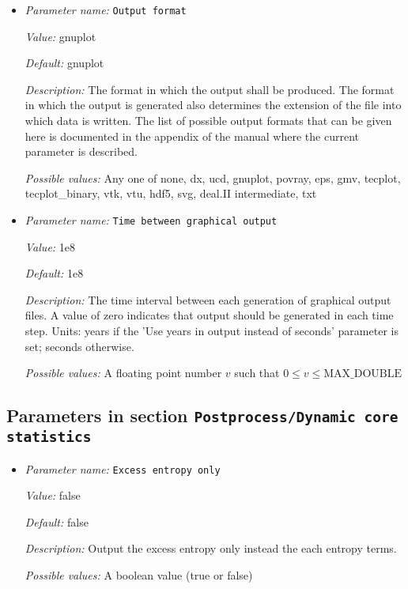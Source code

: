 \begin{itemize}
{\it Possible values:} An integer $n$ such that $1\leq n \leq 2147483647$
\item {\it Parameter name:} {\tt Output format}
\label{parameters:Postprocess/Depth average/Output format}
\label{parameters:Postprocess/Depth_20average/Output_20format}


{\it Value:} gnuplot


{\it Default:} gnuplot


{\it Description:} The format in which the output shall be produced. The format in which the output is generated also determines the extension of the file into which data is written. The list of possible output formats that can be given here is documented in the appendix of the manual where the current parameter is described.


{\it Possible values:} Any one of none, dx, ucd, gnuplot, povray, eps, gmv, tecplot, tecplot\_binary, vtk, vtu, hdf5, svg, deal.II intermediate, txt
\item {\it Parameter name:} {\tt Time between graphical output}
\label{parameters:Postprocess/Depth average/Time between graphical output}
\label{parameters:Postprocess/Depth_20average/Time_20between_20graphical_20output}


{\it Value:} 1e8


{\it Default:} 1e8


{\it Description:} The time interval between each generation of graphical output files. A value of zero indicates that output should be generated in each time step. Units: years if the 'Use years in output instead of seconds' parameter is set; seconds otherwise.


{\it Possible values:} A floating point number $v$ such that $0 \leq v \leq \text{MAX\_DOUBLE}$
\end{itemize}

\subsection{Parameters in section \tt Postprocess/Dynamic core statistics}
\label{parameters:Postprocess/Dynamic_20core_20statistics}

\begin{itemize}
\item {\it Parameter name:} {\tt Excess entropy only}
\label{parameters:Postprocess/Dynamic core statistics/Excess entropy only}
\label{parameters:Postprocess/Dynamic_20core_20statistics/Excess_20entropy_20only}


{\it Value:} false


{\it Default:} false


{\it Description:} Output the excess entropy only instead the each entropy terms.


{\it Possible values:} A boolean value (true or false)
\end{itemize}

